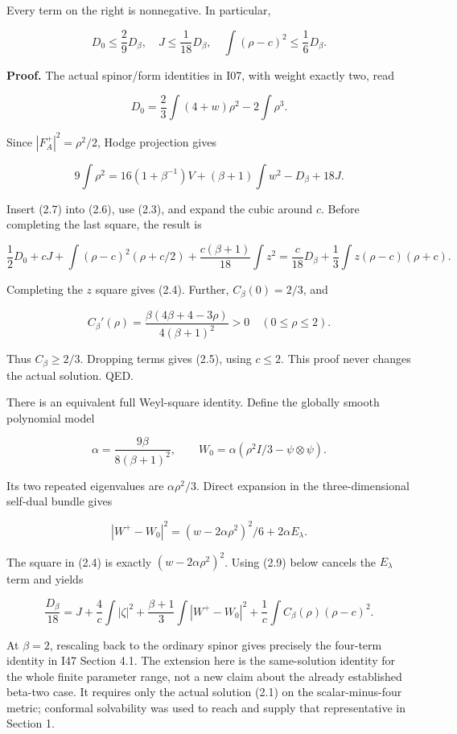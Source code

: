 \documentclass[
  10pt,
]{article}
\begin{document}
Every term on the right is nonnegative. In particular,

\[
 \boxed{D_0\le\frac29D_\beta,\quad
 J\le\frac1{18}D_\beta,\quad
 \int(\rho-c)^2\le\frac16D_\beta.}
 \tag{2.5}
\]

\textbf{Proof.} The actual spinor/form identities in I07, with weight
exactly two, read

\[
 D_0=\frac23\int(4+w)\rho^2-2\int\rho^3.
 \tag{2.6}
\]

Since \(|F_A^+|^2=\rho^2/2\), Hodge projection gives

\[
 9\int\rho^2
 =16(1+\beta^{-1})V+(\beta+1)\int w^2-D_\beta+18J.
 \tag{2.7}
\]

Insert (2.7) into (2.6), use (2.3), and expand the cubic around \(c\).
Before completing the last square, the result is

\[
 \frac12D_0+cJ+\int(\rho-c)^2(\rho+c/2)
  +\frac{c(\beta+1)}{18}\int z^2
 =\frac c{18}D_\beta+\frac13\int z(\rho-c)(\rho+c).
 \tag{2.8}
\]

Completing the \(z\) square gives (2.4). Further, \(C_\beta(0)=2/3\),
and

\[
 C_\beta'(\rho)
 =\frac{\beta(4\beta+4-3\rho)}{4(\beta+1)^2}>0
 \quad (0\le\rho\le2).
\]

Thus \(C_\beta\ge2/3\). Dropping terms gives (2.5), using \(c\le2\).
This proof never changes the actual solution. QED.

There is an equivalent full Weyl-square identity. Define the globally
smooth polynomial model

\[
 \alpha=\frac{9\beta}{8(\beta+1)^2},\qquad
 W_0=\alpha(\rho^2 I/3-\psi\otimes\psi).
\]

Its two repeated eigenvalues are \(\alpha\rho^2/3\). Direct expansion in
the three-dimensional self-dual bundle gives

\[
 |W^+-W_0|^2=(w-2\alpha\rho^2)^2/6+2\alpha E_\lambda.
\]

The square in (2.4) is exactly \((w-2\alpha\rho^2)^2\). Using (2.9)
below cancels the \(E_\lambda\) term and yields

\[
 \boxed{\frac{D_\beta}{18}=J+\frac4c\int|\zeta|^2
 +\frac{\beta+1}{3}\int|W^+-W_0|^2
 +\frac1c\int C_\beta(\rho)(\rho-c)^2.}
 \tag{2.9a}
\]

At \(\beta=2\), rescaling back to the ordinary spinor gives precisely
the four-term identity in I47 Section 4.1. The extension here is the
same-solution identity for the whole finite parameter range, not a new
claim about the already established beta-two case. It requires only the
actual solution (2.1) on the scalar-minus-four metric; conformal
solvability was used to reach and supply that representative in Section
1.
\end{document}
